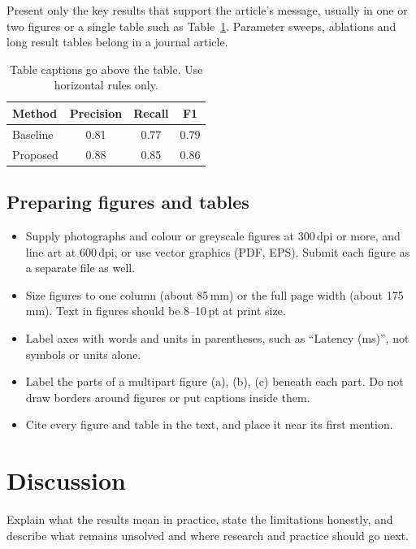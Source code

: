 \documentclass[magazine,anonymous,lineno,{{CITEOPT}}]{nextgeniq}
\begin{document}
Present only the key results that support the article's message, usually in
one or two figures or a single table such as Table~\ref{tab:results}.
Parameter sweeps, ablations and long result tables belong in a journal
article.

\begin{table}[t]
  \centering
  \caption{Table captions go above the table. Use horizontal rules only.}
  \label{tab:results}
  \begin{tabular}{lccc}
    \toprule
    Method   & Precision & Recall & F1 \\
    \midrule
    Baseline & 0.81      & 0.77   & 0.79 \\
    Proposed & 0.88      & 0.85   & 0.86 \\
    \bottomrule
  \end{tabular}
\end{table}

\subsection{Preparing figures and tables}

\begin{itemize}
  \item Supply photographs and colour or greyscale figures at 300\,dpi or
  more, and line art at 600\,dpi, or use vector graphics (PDF, EPS). Submit
  each figure as a separate file as well.
  \item Size figures to one column (about 85\,mm) or the full page width
  (about 175\,mm). Text in figures should be 8--10\,pt at print size.
  \item Label axes with words and units in parentheses, such as
  ``Latency (ms)'', not symbols or units alone.
  \item Label the parts of a multipart figure (a), (b), (c) beneath each part.
  Do not draw borders around figures or put captions inside them.
  \item Cite every figure and table in the text, and place it near its first
  mention.
\end{itemize}

\section{Discussion}

Explain what the results mean in practice, state the limitations honestly,
and describe what remains unsolved and where research and practice should go
next.
\end{document}
